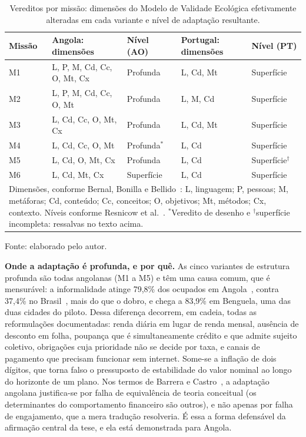 \begin{table}[h!]
\centering
\small
\caption{Vereditos por missão: dimensões do Modelo de Validade Ecológica efetivamente alteradas em cada variante e nível de adaptação resultante.}
\label{tab:variantes_veredito}
\setlength{\tabcolsep}{4pt}
\begin{tabular}{lllll}
\hline
\textbf{Missão} & \textbf{Angola: dimensões} & \textbf{Nível (AO)} & \textbf{Portugal: dimensões} & \textbf{Nível (PT)} \\
\hline
M1 & L, P, M, Cd, Cc, O, Mt, Cx & Profunda & L, Cd, Mt & Superfície \\
M2 & L, P, M, Cd, Cc, O, Mt & Profunda & L, M, Cd & Superfície \\
M3 & L, Cd, Cc, O, Mt, Cx & Profunda & L, Cd, Mt & Superfície \\
M4 & L, Cd, Cc, O, Mt & Profunda$^{*}$ & L, Cd & Superfície \\
M5 & L, Cd, O, Mt, Cx & Profunda & L, Cd & Superfície$^{\dagger}$ \\
M6 & L, Cd, Mt, Cx & Superfície & L, Cd & Superfície \\
\hline
\multicolumn{5}{p{0.92\textwidth}}{\footnotesize Dimensões, conforme Bernal, Bonilla e Bellido~\cite{bernal1995}: L, linguagem; P, pessoas; M, metáforas; Cd, conteúdo; Cc, conceitos; O, objetivos; Mt, métodos; Cx, contexto. Níveis conforme Resnicow et al.~\cite{resnicow1999}. $^{*}$Veredito de desenho e $^{\dagger}$superfície incompleta: ressalvas no texto acima.} \\
\hline
\end{tabular}

{\footnotesize Fonte: elaborado pelo autor.}
\end{table}

\noindent\textbf{Onde a adaptação é profunda, e por quê.} As cinco variantes de estrutura profunda são todas angolanas (M1 a M5) e têm uma causa comum, que é mensurável: a informalidade atinge 79,8\% dos ocupados em Angola~\cite{ineangola2024emprego}, contra 37,4\% no Brasil~\cite{ibge2026pnad}, mais do que o dobro, e chega a 83,9\% em Benguela, uma das duas cidades do piloto. Dessa diferença decorrem, em cadeia, todas as reformulações documentadas: renda diária em lugar de renda mensal, ausência de desconto em folha, poupança que é simultaneamente crédito e que admite sujeito coletivo, obrigações cuja prioridade não se decide por taxa, e canais de pagamento que precisam funcionar sem internet. Some-se a inflação de dois dígitos, que torna falso o pressuposto de estabilidade do valor nominal ao longo do horizonte de um plano. Nos termos de Barrera e Castro~\cite{barrera2006}, a adaptação angolana justifica-se por falha de equivalência de teoria conceitual (os determinantes do comportamento financeiro são outros), e não apenas por falha de engajamento, que a mera tradução resolveria. É essa a forma defensável da afirmação central da tese, e ela está demonstrada para Angola.

